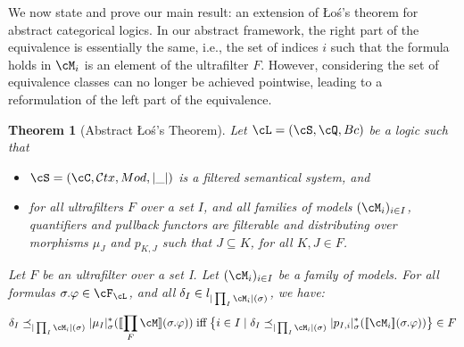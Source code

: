 \documentclass[preprint,3p,times]{elsarticle}
\newtheorem{theorem}[definition]{Theorem}
\def\sem#1{[\![ #1 ] \!]}
\newcommand{\Ctx}{\mathcal{C}tx}
\newcommand{\Los}{\L{}o{\'s}}
\newcommand{\bigset}[1]{\big\{#1\big\}}                     %
\begin{document}
We now state and prove our main result: an extension of \Los's theorem for abstract categorical logics. In our abstract framework, the right part of the equivalence is essentially the same, i.e., the set of indices $i$ such that the formula holds in $\cM_i$ is an element of the ultrafilter $F$. However, considering the set of equivalence classes can no longer be achieved pointwise, leading to a reformulation of the left part of the equivalence.

\begin{theorem}[Abstract \Los's Theorem]
\label{th:Los}
Let \(\cL = (\cS,\cQ,Bc)\) be a logic such that 
\begin{itemize}
	\item $\cS = (\cC,\Ctx,Mod,|\_|)$ is a filtered semantical system, and
	\item for all ultrafilters $F$ over a set  $I$, and all families of models $(\cM_i)_{i \in I}$, quantifiers and pullback functors are filterable and distributing over morphisms $\mu_J$ and $p_{K,J}$ such that $J \subseteq K$, for all $K,J \in F$.
\end{itemize}

Let $F$ be an ultrafilter over a set I. Let $(\cM_i)_{i \in I}$ be a family of models. For all formulas \(\sigma.\varphi \in \cF_\cL\), and all $\delta_I \in l_{|\prod_I \cM_i|(\sigma)}$, we have:
\[
\delta_I \preceq_{|\prod_I \cM_i|(\sigma)} |\mu_I|^*_\sigma(\sem{\prod_F \cM}(\sigma.\varphi)) \; \mbox{iff} \; \bigset{i \in I \mid \delta_I \preceq_{|\prod_I \cM_i|(\sigma)} |p_{I,i}|^*_\sigma(\sem{\cM_i}(\sigma.\varphi))} \in F
\]
\end{theorem}
\end{document}
